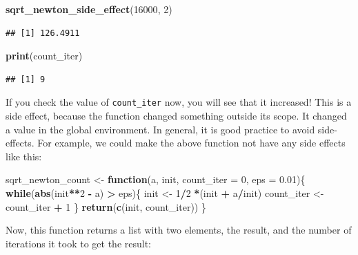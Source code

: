 \documentclass[]{gitbook}
\newenvironment{Shaded}{\begin{snugshade}}{\end{snugshade}}
\newcommand{\ControlFlowTok}[1]{\textcolor[rgb]{0.13,0.29,0.53}{\textbf{#1}}}
\newcommand{\DataTypeTok}[1]{\textcolor[rgb]{0.13,0.29,0.53}{#1}}
\newcommand{\DecValTok}[1]{\textcolor[rgb]{0.00,0.00,0.81}{#1}}
\newcommand{\FloatTok}[1]{\textcolor[rgb]{0.00,0.00,0.81}{#1}}
\newcommand{\KeywordTok}[1]{\textcolor[rgb]{0.13,0.29,0.53}{\textbf{#1}}}
\newcommand{\NormalTok}[1]{#1}
\newcommand{\OperatorTok}[1]{\textcolor[rgb]{0.81,0.36,0.00}{\textbf{#1}}}
\newcommand{\StringTok}[1]{\textcolor[rgb]{0.31,0.60,0.02}{#1}}
\theoremstyle{definition}
\theoremstyle{definition}
\theoremstyle{definition}
\theoremstyle{remark}
\begin{document}
\begin{Shaded}
\begin{Highlighting}[]
\KeywordTok{sqrt_newton_side_effect}\NormalTok{(}\DecValTok{16000}\NormalTok{, }\DecValTok{2}\NormalTok{)}
\end{Highlighting}
\end{Shaded}

\begin{verbatim}
## [1] 126.4911
\end{verbatim}

\begin{Shaded}
\begin{Highlighting}[]
\KeywordTok{print}\NormalTok{(count_iter)}
\end{Highlighting}
\end{Shaded}

\begin{verbatim}
## [1] 9
\end{verbatim}

If you check the value of \texttt{count\_iter} now, you will see that it
increased! This is a side effect, because the function changed something
outside its scope. It changed a value in the global environment. In
general, it is good practice to avoid side-effects. For example, we
could make the above function not have any side effects like this:

\begin{Shaded}
\begin{Highlighting}[]
\NormalTok{sqrt_newton_count <-}\StringTok{ }\ControlFlowTok{function}\NormalTok{(a, init, }\DataTypeTok{count_iter =} \DecValTok{0}\NormalTok{, }\DataTypeTok{eps =} \FloatTok{0.01}\NormalTok{)\{}
    \ControlFlowTok{while}\NormalTok{(}\KeywordTok{abs}\NormalTok{(init}\OperatorTok{**}\DecValTok{2} \OperatorTok{-}\StringTok{ }\NormalTok{a) }\OperatorTok{>}\StringTok{ }\NormalTok{eps)\{}
\NormalTok{        init <-}\StringTok{ }\DecValTok{1}\OperatorTok{/}\DecValTok{2} \OperatorTok{*}\NormalTok{(init }\OperatorTok{+}\StringTok{ }\NormalTok{a}\OperatorTok{/}\NormalTok{init)}
\NormalTok{        count_iter <-}\StringTok{ }\NormalTok{count_iter }\OperatorTok{+}\StringTok{ }\DecValTok{1}
\NormalTok{    \}}
    \KeywordTok{return}\NormalTok{(}\KeywordTok{c}\NormalTok{(init, count_iter))}
\NormalTok{\}}
\end{Highlighting}
\end{Shaded}

Now, this function returns a list with two elements, the result, and the
number of iterations it took to get the result:
\end{document}
